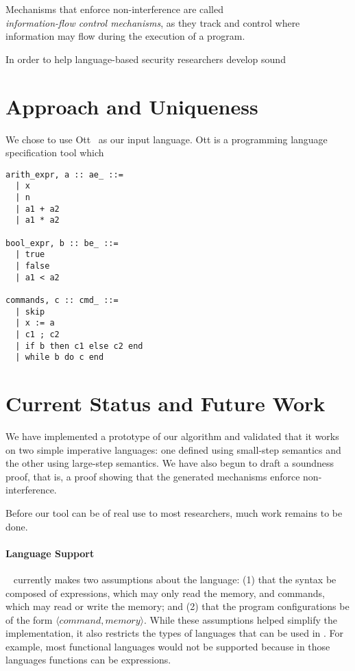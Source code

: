 \documentclass[sigplan,10pt]{acmart}\settopmatter{printfolios=true,printccs=false,printacmref=false}
\begin{document}
Mechanisms that enforce non-interference are called \\\emph{information-flow control mechanisms}, as they track and control where information may flow during the execution of a program.

In order to help language-based security researchers develop sound




\section{Approach and Uniqueness}
We chose to use Ott~\cite{DBLP:journals/jfp/SewellNOPRSS10} as our input language. Ott is a programming language specification tool which 



\begin{lstlisting}[captionpos=b,caption=Syntax of a simple imperative language]
arith_expr, a :: ae_ ::=
  | x         
  | n                        
  | a1 + a2                  
  | a1 * a2                       

bool_expr, b :: be_ ::=
  | true                        
  | false   
  | a1 < a2          

commands, c :: cmd_ ::=
  | skip    
  | x := a 
  | c1 ; c2           
  | if b then c1 else c2 end
  | while b do c end   
\end{lstlisting}

\section{Current Status and Future Work}
We have implemented a prototype of our algorithm and validated that it works on two simple imperative languages: one defined using small-step semantics and the other using large-step semantics. We have also begun to draft a soundness proof, that is, a proof showing that the generated mechanisms enforce non-interference.

Before our tool can be of real use to most researchers, much work remains to be done.

\paragraph{Language Support} \ottifc~ currently makes two assumptions about the language: (1) that the syntax be composed of expressions, which may only read the memory, and commands, which may read or write the memory; and (2) that the program configurations be of the form $\langle command, memory\rangle$. While these assumptions helped simplify the implementation, it also restricts the types of languages that can be used in \ottifc. For example, most functional languages would not be supported because in those languages functions can be expressions. 
\end{document}
